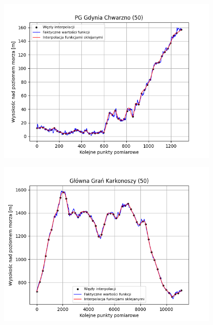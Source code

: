 \documentclass[fleqn]{article}
\begin{document}
    \begin{figure}[h]
        \centering
        \begin{minipage}{.33\textwidth}
            \centering
            \includegraphics[width=\linewidth]{plot_50_points_PG_Gdynia_Chwarzno.png}
            \label{fig:sub1}
        \end{minipage}%
        \begin{minipage}{.33\textwidth}
          \centering
          \includegraphics[width=\linewidth]{plot_50_points_Główna_Grań_Karkonoszy.png}
          \label{fig:sub2}
        \end{minipage}%
        \begin{minipage}{.33\textwidth}
          \centering

\end{minipage}
\end{figure}
\end{document}
